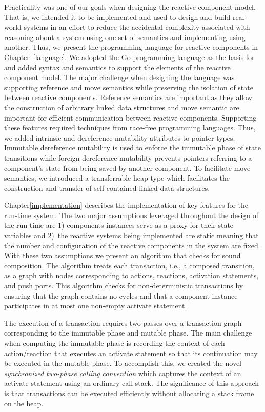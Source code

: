 Practicality was one of our goals when designing the reactive component model.
That is, we intended it to be implemented and used to design and build real-world systems in an effort to reduce the accidental complexity associated with reasoning about a system using one set of semantics and implementing using another.
Thus, we present the \rcgo{} programming language for reactive components in Chapter~\ref{language}.
We adopted the Go programming language as the basis for \rcgo{} and added syntax and semantics to support the elements of the reactive component model.
The major challenge when designing the language was supporting reference and move semantics while preserving the isolation of state between reactive components.
Reference semantics are important as they allow the construction of arbitrary linked data structures and move semantic are important for efficient communication between reactive components.
Supporting these features required techniques from race-free programming languages.
Thus, we added intrinsic and dereference mutability attributes to pointer types.
Immutable dereference mutability is used to enforce the immutable phase of state transitions while foreign dereference mutability prevents pointers referring to a component's state from being saved by another component.
To facilitate move semantics, we introduced a transferrable heap type which facilitates the construction and transfer of self-contained linked data structures.

Chapter\ref{implementation} describes the implementation of key features for the \rcgo{} run-time system.
The two major assumptions leveraged throughout the design of the run-time are 1) components instances serve as a proxy for their state variables and 2)~the reactive systems being implemented are static meaning that the number and configuration of the reactive components in the system are fixed.
With these two assumptions we present an algorithm that checks for sound composition.
The algorithm treats each transaction, i.e., a composed transition, as a graph with nodes corresponding to actions, reactions, activation statements, and push ports.
This algorithm checks for non-deterministic transactions by ensuring that the graph contains no cycles and that a component instance participates in at most one non-empty activate statement.

The execution of a transaction requires two passes over a transaction graph corresponding to the immutable phase and mutable phase.
The main challenge when computing the immutable phase is recording the context of each action/reaction that executes an activate statement so that its continuation may be executed in the mutable phase.
To accomplish this, we created the novel \emph{synchronized two-phase calling convention} which captures the context of an activate statement using an ordinary call stack.
The significance of this approach is that transactions can be executed efficiently without allocating a stack frame on the heap.

